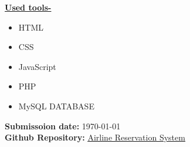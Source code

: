 \documentclass[12pt]{article}
\begin{document}
\vspace{5mm}
\LARGE \textbf{\underline{Used tools-}}   \\
\normalsize
\begin{itemize}
\itemsep0em
\item HTML
\item CSS
\item JavaScript
\item PHP
\item MySQL DATABASE
\end{itemize}
\vspace*{5\baselineskip} 
\large \color{red}  \textbf{Submissoion date:} \color{black} \today \\
\large \color{red}  \textbf{Github Repository:} \color{blue} \underline{ \href{https://github.com/Asif-cra/Airline-Reservation-System.git}{Airline Reservation System} }
\end{document}
